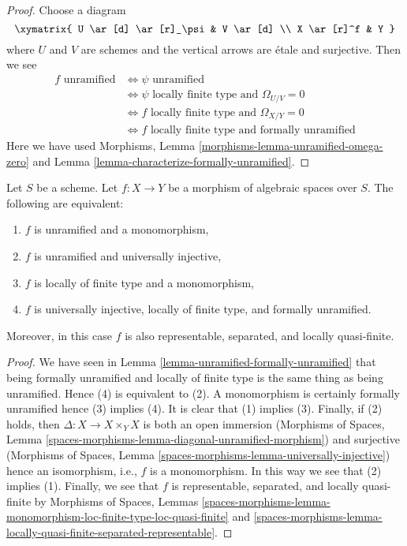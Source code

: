 \begin{proof}
Choose a diagram
$$
\xymatrix{
U \ar[d] \ar[r]_\psi & V \ar[d] \\
X \ar[r]^f & Y
}
$$
where $U$ and $V$ are schemes and the vertical arrows are \'etale and
surjective. Then we see
\begin{align*}
f\text{ unramified}
& \Leftrightarrow
\psi\text{ unramified} \\
& \Leftrightarrow
\psi\text{ locally finite type and }\Omega_{U/V} = 0 \\
& \Leftrightarrow
f\text{ locally finite type and }\Omega_{X/Y} = 0 \\
& \Leftrightarrow
f\text{ locally finite type and formally unramified}
\end{align*}
Here we have used
Morphisms, Lemma \ref{morphisms-lemma-unramified-omega-zero} and
Lemma \ref{lemma-characterize-formally-unramified}.
\end{proof}

\begin{lemma}
\label{lemma-universally-injective-unramified}
Let $S$ be a scheme.
Let $f : X \to Y$ be a morphism of algebraic spaces over $S$.
The following are equivalent:
\begin{enumerate}
\item $f$ is unramified and a monomorphism,
\item $f$ is unramified and universally injective,
\item $f$ is locally of finite type and a monomorphism,
\item $f$ is universally injective, locally of finite type, and
formally unramified.
\end{enumerate}
Moreover, in this case $f$ is also representable, separated, and
locally quasi-finite.
\end{lemma}

\begin{proof}
We have seen in
Lemma \ref{lemma-unramified-formally-unramified}
that being formally unramified and locally of finite type is the same thing
as being unramified.
Hence (4) is equivalent to (2).
A monomorphism is certainly formally unramified hence (3) implies (4).
It is clear that (1) implies (3). Finally, if (2) holds, then
$\Delta : X \to X \times_Y X$ is both an open immersion
(Morphisms of Spaces, Lemma
\ref{spaces-morphisms-lemma-diagonal-unramified-morphism})
and surjective
(Morphisms of Spaces, Lemma
\ref{spaces-morphisms-lemma-universally-injective})
hence an isomorphism, i.e., $f$ is a monomorphism. In this way we see that
(2) implies (1).
Finally, we see that $f$ is representable, separated, and locally
quasi-finite by
Morphisms of Spaces, Lemmas
\ref{spaces-morphisms-lemma-monomorphism-loc-finite-type-loc-quasi-finite} and
\ref{spaces-morphisms-lemma-locally-quasi-finite-separated-representable}.
\end{proof}

